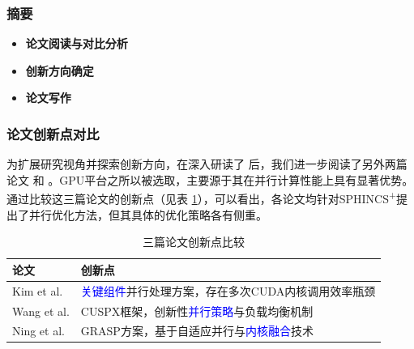\documentclass[slide]{../../custom}
\begin{document}
\begin{frame}
  \titlepage
\end{frame}

\begin{frame}
  \frametitle{摘要}
  \begin{itemize}
    \item \textbf{论文阅读与对比分析}
    \item \textbf{创新方向确定}
    \item \textbf{论文写作}
  \end{itemize}
\end{frame}

\begin{frame}
  \frametitle{论文创新点对比}
  为扩展研究视角并探索创新方向，在深入研读了 \cite{Wang2025} 后，我们进一步阅读了另外两篇论文 \cite{Kim2024} 和 \cite{Ning2024}。GPU平台之所以被选取，主要源于其在并行计算性能上具有显著优势。通过比较这三篇论文的创新点（见表 \ref{tab:innovation}），可以看出，各论文均针对SPHINCS\textsuperscript{+}提出了并行优化方法，但其具体的优化策略各有侧重。
  \begin{table}
    \centering
    \caption{三篇论文创新点比较}
    \label{tab:innovation}
    \begin{tabular}{l p{}}
      \toprule
      论文 & 创新点 \\
      \midrule
      Kim et al. \cite{Kim2024} & \textcolor{blue}{关键组件}并行处理方案，存在多次CUDA内核调用效率瓶颈 \\
      Wang et al. \cite{Wang2025} & CUSPX框架，创新性\textcolor{blue}{并行策略}与负载均衡机制 \\
      Ning et al. \cite{Ning2024} & GRASP方案，基于自适应并行与\textcolor{blue}{内核融合}技术 \\
      \bottomrule
    \end{tabular}
  \end{table}
\end{frame}
\end{document}
